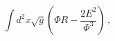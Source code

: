 \begin{equation*}
\int d^{2}x\sqrt{g}\left( \Phi R-\frac{2 E^{2}}{\Phi ^{3}}\right)\, ,
\end{equation*}

